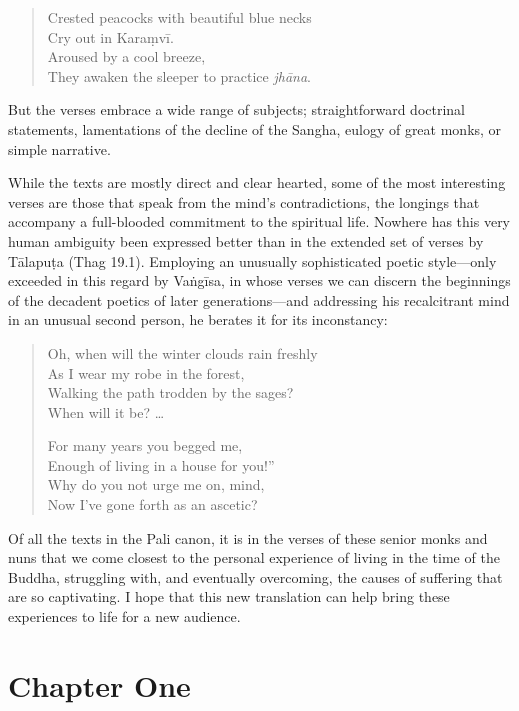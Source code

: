 \documentclass[10pt, openany]{book}
\newcommand*{\vleftofline}[1]{\leavevmode\llap{#1}}
\begin{document}
\begin{quote}Crested peacocks with beautiful blue necks\\
Cry out in Karaṃvī.\\
Aroused by a cool breeze,\\
They awaken the sleeper to practice \emph{jhāna}.\end{quote}

But the verses embrace a wide range of subjects; straightforward doctrinal statements, lamentations of the decline of the Sangha, eulogy of great monks, or simple narrative.

While the texts are mostly direct and clear heart\-ed, some of the most interesting verses are those that speak from the mind’s contradictions, the longings that accompany a full-blooded commitment to the spiritual life. Nowhere has this very human ambiguity been expressed better than in the extended set of verses by Tālapuṭa (Thag 19.1). Employing an unusually sophisticated poetic style—only exceeded in this regard by Vaṅgīsa, in whose verses we can discern the beginnings of the decadent poetics of later generations—and addressing his recalcitrant mind in an unusual second person, he berates it for its inconstancy:

\begin{quote}Oh, when will the winter clouds rain freshly\\
As I wear my robe in the forest,\\
Walking the path trodden by the sages?\\
When will it be? …

For many years you begged me,\\
\vleftofline{“}Enough of living in a house for you!”\\
Why do you not urge me on, mind,\\
Now I’ve gone forth as an ascetic?\end{quote}

Of all the texts in the Pali canon, it is in the verses of these senior monks and nuns that we come closest to the personal experience of living in the time of the Buddha, struggling with, and eventually overcoming, the causes of suffering that are so captivating. I hope that this new translation can help bring these experiences to life for a new audience.

\chapter*{Chapter One}
\end{document}
